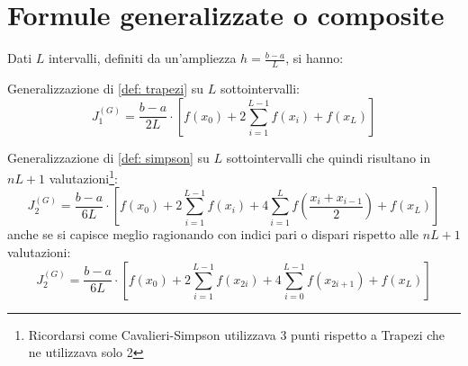 \documentclass[12pt,a4paper,]{report}
\begin{document}
\section{Formule generalizzate o composite}
Dati $L$ intervalli, definiti da un'ampliezza $h=\frac{b-a}{L}$, si hanno:
\begin{definizione}
    Generalizzazione di \autoref{def: trapezi} su $L$ sottointervalli:
    \[
    J_1^{(G)} = \frac{b-a}{2L} \cdot \left[ f(x_0) +2\sum_{i=1}^{L-1}f(x_i) + f(x_L)\right]
    \]
\end{definizione}
\begin{definizione}
    Generalizzazione di \autoref{def: simpson} su $L$ sottointervalli che quindi risultano in $nL+1$ valutazioni\footnote{Ricordarsi come Cavalieri-Simpson utilizzava 3 punti rispetto a Trapezi che ne utilizzava solo 2}:
    \[
    J_2^{(G)} = \frac{b-a}{6L} \cdot \left[ f(x_0) +2\sum_{i=1}^{L-1}f(x_i) +4\sum_{i=1}^{L}f\left(\frac{x_i+x_{i-1}}{2}\right) + f(x_L)\right]
    \]
    anche se si capisce meglio ragionando con indici pari o dispari rispetto alle $nL+1$ valutazioni:
    \[
        J_2^{(G)} = \frac{b-a}{6L} \cdot \left[ f(x_0) +2\sum_{i=1}^{L-1}f(x_{2i}) +4\sum_{i=0}^{L-1}f\left(x_{2i+1}\right) + f(x_L)\right]
    \]
\end{definizione}
\end{document}
